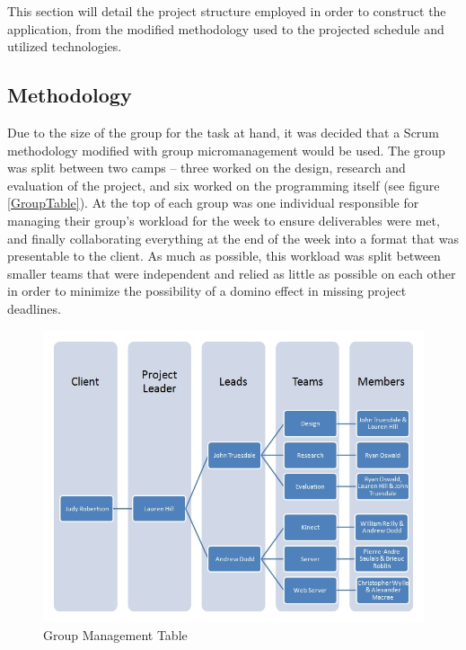 This section will detail the project structure employed in order to construct the application, from the modified methodology used to the projected schedule and utilized technologies.

\subsection{Methodology}
Due to the size of the group for the task at hand, it was decided that a Scrum methodology modified with group micromanagement would be used. The group was split between two camps -- three worked on the design, research and evaluation of the project, and six worked on the programming itself (see figure \vref{GroupTable}). At the top of each group was one individual responsible for managing their group's workload for the week to ensure deliverables were met, and finally collaborating everything at the end of the week into a format that was presentable to the client. As much as possible, this workload was split between smaller teams that were independent and relied as little as possible on each other in order to minimize the possibility of a domino effect in missing project deadlines.

\begin{figure}[p]
\begin{centering}
\includegraphics[width=\textwidth]{Diagrams/GroupTable.jpg}
\par\end{centering}

\caption{Group Management Table}
\label{GroupTable}
\end{figure}

